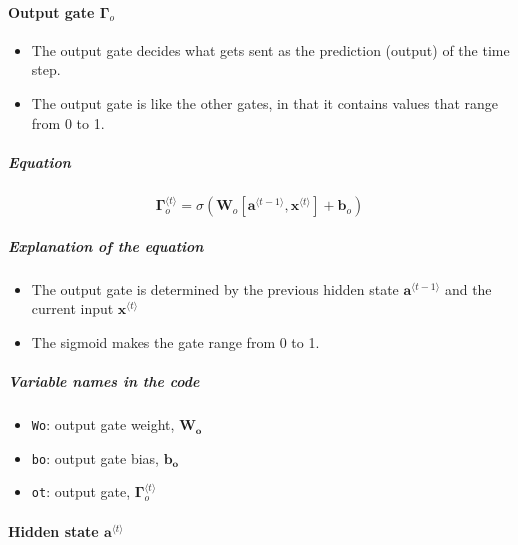 \documentclass[11pt]{article}
\providecommand{\tightlist}{%
      \setlength{\itemsep}{0pt}\setlength{\parskip}{0pt}}
\begin{document}
    \hypertarget{output-gate-mathbfgamma_o}{%
\paragraph{\texorpdfstring{Output gate
\(\mathbf{\Gamma}_{o}\)}{Output gate \textbackslash mathbf\{\textbackslash Gamma\}\_\{o\}}}\label{output-gate-mathbfgamma_o}}

\begin{itemize}
\tightlist
\item
  The output gate decides what gets sent as the prediction (output) of
  the time step.
\item
  The output gate is like the other gates, in that it contains values
  that range from 0 to 1.
\end{itemize}

\hypertarget{equation}{%
\subparagraph{Equation}\label{equation}}

\[ \mathbf{\Gamma}_o^{\langle t \rangle}=  \sigma(\mathbf{W}_o[\mathbf{a}^{\langle t-1 \rangle}, \mathbf{x}^{\langle t \rangle}] + \mathbf{b}_{o})\tag{5}\]

\hypertarget{explanation-of-the-equation}{%
\subparagraph{Explanation of the
equation}\label{explanation-of-the-equation}}

\begin{itemize}
\tightlist
\item
  The output gate is determined by the previous hidden state
  \(\mathbf{a}^{\langle t-1 \rangle}\) and the current input
  \(\mathbf{x}^{\langle t \rangle}\)
\item
  The sigmoid makes the gate range from 0 to 1.
\end{itemize}

\hypertarget{variable-names-in-the-code}{%
\subparagraph{Variable names in the
code}\label{variable-names-in-the-code}}

\begin{itemize}
\tightlist
\item
  \texttt{Wo}: output gate weight, \(\mathbf{W_o}\)
\item
  \texttt{bo}: output gate bias, \(\mathbf{b_o}\)
\item
  \texttt{ot}: output gate, \(\mathbf{\Gamma}_{o}^{\langle t \rangle}\)
\end{itemize}

    \hypertarget{hidden-state-mathbfalangle-t-rangle}{%
\paragraph{\texorpdfstring{Hidden state
\(\mathbf{a}^{\langle t \rangle}\)}{Hidden state \textbackslash mathbf\{a\}\^{}\{\textbackslash langle t \textbackslash rangle\}}}\label{hidden-state-mathbfalangle-t-rangle}}
\end{document}
